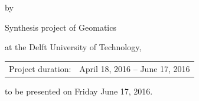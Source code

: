 \begin{titlepage}


\begin{center}


{\makeatletter
\largetitlestyle\fontsize{64}{94}\selectfont\@title
\makeatother}

{\makeatletter
\ifx\@subtitle\undefined\else
    \bigskip
   {\tudsffamily\fontsize{22}{32}\selectfont\@subtitle}    
\fi
\makeatother}

\bigskip
\bigskip

by

\bigskip
\bigskip

{\makeatletter
\largetitlestyle\fontsize{26}{26}\selectfont\@author
\makeatother}

\bigskip
\bigskip

{\fontsize{15}{0.2}\selectfont Synthesis project of Geomatics

at the Delft University of Technology,}

\vfill

\begin{tabular}{lll}
    Project duration: & \multicolumn{2}{l}{April 18, 2016 -- June 17, 2016} \\
\end{tabular}

\bigskip
\bigskip
\bigskip
\bigskip
to be presented on Friday June 17, 2016.
\end{center}


\end{titlepage}

